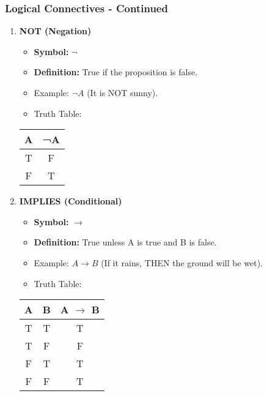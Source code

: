 \documentclass[aspectratio=169]{beamer}
\begin{document}
\begin{frame}[fragile]
    \frametitle{Logical Connectives - Continued}
    \begin{enumerate}[resume]
        \item \textbf{NOT (Negation)} 
        \begin{itemize}
            \item \textbf{Symbol:} $\neg$ 
            \item \textbf{Definition:} True if the proposition is false.
            \item Example: $¬A$ (It is NOT sunny).
            \item Truth Table:
        \end{itemize}
        \begin{center}
            \begin{tabular}{|c|c|}
                \hline
                A & ¬A \\
                \hline
                T & F \\
                F & T \\
                \hline
            \end{tabular}
        \end{center}
        
        \item \textbf{IMPLIES (Conditional)} 
        \begin{itemize}
            \item \textbf{Symbol:} $\rightarrow$ 
            \item \textbf{Definition:} True unless A is true and B is false.
            \item Example: $A \rightarrow B$ (If it rains, THEN the ground will be wet).
            \item Truth Table:
        \end{itemize}
        \begin{center}
            \begin{tabular}{|c|c|c|}
                \hline
                A & B & A $\rightarrow$ B \\
                \hline
                T & T & T \\
                T & F & F \\
                F & T & T \\
                F & F & T \\
                \hline
            \end{tabular}
        \end{center}
    \end{enumerate}
\end{frame}
\end{document}
